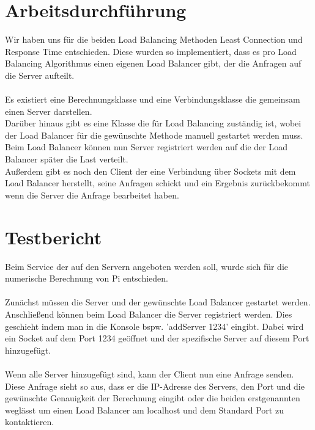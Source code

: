 \documentclass[a4paper,12pt]{scrreprt}
\begin{document}
\chapter{Arbeitsdurchführung}
Wir haben uns für die beiden Load Balancing Methoden Least Connection und Response Time entschieden. Diese wurden so implementiert, dass es pro Load Balancing Algorithmus einen eigenen Load Balancer gibt, der die Anfragen auf die Server aufteilt.\\\\
Es existiert eine Berechnungsklasse und eine Verbindungsklasse die gemeinsam einen Server darstellen. \\
Darüber hinaus gibt es eine Klasse die für Load Balancing zuständig ist, wobei der Load Balancer für die gewünschte Methode manuell gestartet werden muss. Beim Load Balancer können nun Server registriert werden auf die der Load Balancer später die Last verteilt.\\
Außerdem gibt es noch den Client der eine Verbindung über Sockets mit dem Load Balancer herstellt, seine Anfragen schickt und ein Ergebnis zurückbekommt wenn die Server die Anfrage bearbeitet haben.
\chapter{Testbericht}
Beim Service der auf den Servern angeboten werden soll, wurde sich für die numerische Berechnung von Pi entschieden.\\\\
Zunächst müssen die Server und der gewünschte Load Balancer gestartet werden. Anschließend können beim Load Balancer die Server registriert werden. Dies geschieht indem man in die Konsole bspw. 'addServer 1234' eingibt. Dabei wird ein Socket auf dem Port 1234 geöffnet und der spezifische Server auf diesem Port hinzugefügt.\\\\
Wenn alle Server hinzugefügt sind, kann der Client nun eine Anfrage senden. Diese Anfrage sieht so aus, dass er die IP-Adresse des Servers, den Port und die gewünschte Genauigkeit der Berechnung eingibt oder die beiden erstgenannten weglässt um einen Load Balancer am localhost und dem Standard Port zu kontaktieren.
\end{document}
